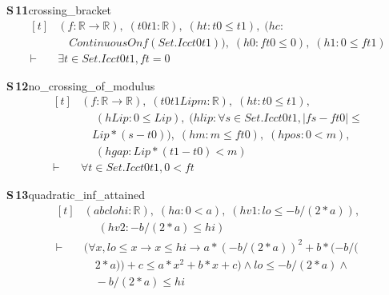 \documentclass[conference]{IEEEtran}
\theoremstyle{definition}
\newcommand{\lean}[1]{\textsf{\footnotesize #1}}
\begin{document}
\noindent\textbf{S\,11}\quad\lean{crossing\_bracket}
{\footnotesize\[ \begin{aligned}[t]
&(\mathit{f} : \mathbb{R} \to \mathbb{R} ),\; (\mathit{t0} \mathit{t1} : \mathbb{R} ),\; (\mathit{ht} : \mathit{t0} \leq \mathit{t1}),\; (\mathit{hc} :\\
&\quad \mathit{ContinuousOn} \mathit{f} (\mathit{Set}.\mathit{Icc} \mathit{t0} \mathit{t1})),\; (\mathit{h0} : \mathit{f} \mathit{t0} \leq 0),\; (\mathit{h1} : 0 \leq \mathit{f} \mathit{t1})\\
\vdash\;&\exists \mathit{t} \in \mathit{Set}.\mathit{Icc} \mathit{t0} \mathit{t1}, \mathit{f} \mathit{t} = 0
\end{aligned} \]}

\noindent\textbf{S\,12}\quad\lean{no\_crossing\_of\_modulus}
{\footnotesize\[ \begin{aligned}[t]
&(\mathit{f} : \mathbb{R} \to \mathbb{R} ),\; (\mathit{t0} \mathit{t1} \mathit{Lip} \mathit{m} : \mathbb{R} ),\; (\mathit{ht} : \mathit{t0} \leq \mathit{t1}),\\
&\quad \; (\mathit{hLip} : 0 \leq \mathit{Lip}),\; (\mathit{hlip} : \forall \mathit{s} \in \mathit{Set}.\mathit{Icc} \mathit{t0} \mathit{t1}, |\mathit{f} \mathit{s} - \mathit{f} \mathit{t0}| \leq\\
&\quad \mathit{Lip} * (\mathit{s} - \mathit{t0})),\; (\mathit{hm} : \mathit{m} \leq \mathit{f} \mathit{t0}),\; (\mathit{hpos} : 0 < \mathit{m}),\\
&\quad \; (\mathit{hgap} : \mathit{Lip} * (\mathit{t1} - \mathit{t0}) < \mathit{m})\\
\vdash\;&\forall \mathit{t} \in \mathit{Set}.\mathit{Icc} \mathit{t0} \mathit{t1}, 0 < \mathit{f} \mathit{t}
\end{aligned} \]}

\noindent\textbf{S\,13}\quad\lean{quadratic\_inf\_attained}
{\footnotesize\[ \begin{aligned}[t]
&(\mathit{a} \mathit{b} \mathit{c} \mathit{lo} \mathit{hi} : \mathbb{R} ),\; (\mathit{ha} : 0 < \mathit{a}),\; (\mathit{hv1} : \mathit{lo} \leq -\mathit{b} / (2 * \mathit{a})),\\
&\quad \; (\mathit{hv2} : -\mathit{b} / (2 * \mathit{a}) \leq \mathit{hi})\\
\vdash\;&(\forall \mathit{x}, \mathit{lo} \leq \mathit{x} \to \mathit{x} \leq \mathit{hi} \to \mathit{a} * (-\mathit{b} / (2 * \mathit{a})) ^{2} + \mathit{b} * (-\mathit{b} / (\\
&\quad 2 * \mathit{a})) + \mathit{c} \leq \mathit{a} * \mathit{x} ^{2} + \mathit{b} * \mathit{x} + \mathit{c}) \wedge \mathit{lo} \leq -\mathit{b} / (2 * \mathit{a}) \wedge\\
&\quad -\mathit{b} / (2 * \mathit{a}) \leq \mathit{hi}
\end{aligned} \]}
\end{document}
